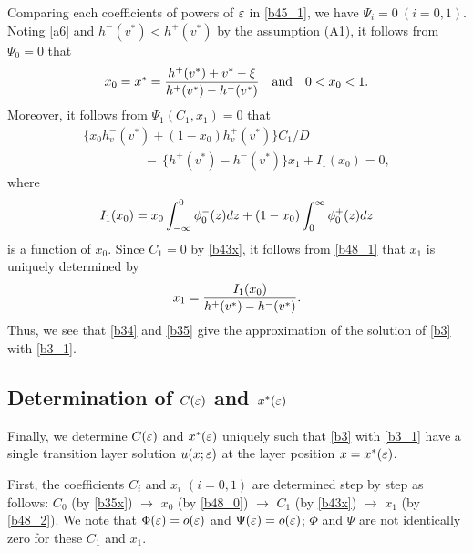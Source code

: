 \documentclass[a4,10pt]{article}
\begin{document}
%
Comparing each coefficients of powers of $\varepsilon$ in \eqref{b45_1}, we have 
$ \Psi_i = 0 \ (i=0,1)$. 
%
%
Noting \eqref{a6} and $h^-(v^*) < h^+(v^*)$ by the assumption (A1), 
it follows from $\Psi_0 = 0$ that
%
\begin{equation}\label{b48_0}
\begin{array}{l}
x_0 = x^* = \dis\frac{ h^+(v^*) + v^* - \xi}{h^+(v^*) - h^-(v^*) }
\ \ \ \text{and} \ \ \ 
0 < x_0 < 1.
\end{array}
\end{equation}
%
Moreover, it follows from $\Psi_1(C_1,x_1) = 0$ that
%
\begin{equation}\label{b48_1}
\begin{array}{l}
\{x_0 h_v^-(v^*)+(1-x_0)h_v^+(v^*)\}C_1/D \hspace{1cm} \\[1ex]
\hspace{2cm} -  \ \{h^+(v^*)-h^-(v^*)\}x_1 + I_1(x_0) = 0,
\end{array}
\end{equation}
%
where 
\[
I_1(x_0) =  x_0 \displaystyle\int_{-\infty}^0   {\phi}_0^-(z) dz 
+ (1-x_0) \displaystyle\int^{\infty}_0   {\phi}_0^+(z) dz
\]
%
is a function of $x_0$. Since $C_1 = 0$ by \eqref{b43x}, 
it follows from \eqref{b48_1} that 
$x_1$ is uniquely determined by 
\begin{equation}\label{b48_2}
\begin{array}{l}
 x_1 = \displaystyle \frac {I_1(x_0)}{h^+(v^*)-h^-(v^*)}.
\end{array}
\end{equation}
Thus, we see that \eqref{b34} and \eqref{b35} give 
the approximation of the solution of \eqref{b3} with \eqref{b3_1}. 

\subsection{Determination of $C(\varepsilon)$ and $x^*(\varepsilon)$}\label{S2.4} %
Finally, we determine  $C(\varepsilon)$ and $x^*(\varepsilon)$ uniquely such that \eqref{b3} with \eqref{b3_1} have a 
single transition layer solution $u(x;\varepsilon)$ at the layer position $ x = x^*(\varepsilon)$. 



First, the coefficients $C_i$ and $x_i$ $(i=0,1)$ are determined step by step as follows:  $C_0$ (by \eqref{b35x}) $\longrightarrow$ 
$x_0$ (by \eqref{b48_0})  $\longrightarrow$ $C_1$ (by \eqref{b43x})  $\longrightarrow$ $x_1$ (by \eqref{b48_2}). We note that $\Phi(\varepsilon) = o(\varepsilon)$ and $\Psi(\varepsilon) = o(\varepsilon)$; $\Phi$ and $\Psi$ are not identically zero for these $C_1$ and $x_1$. 
\end{document}
